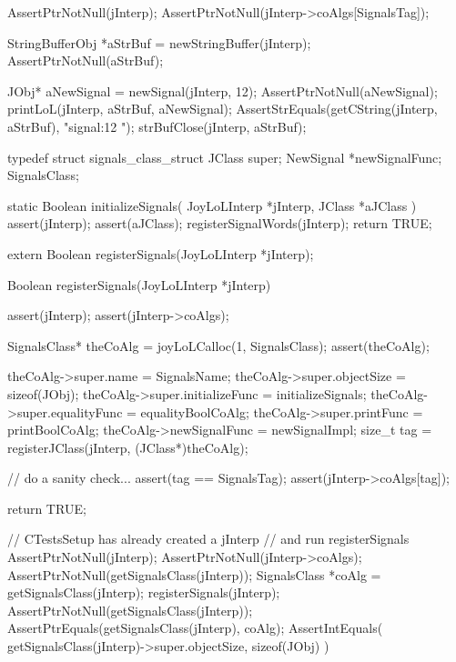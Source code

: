 \startCTest
  AssertPtrNotNull(jInterp);
  AssertPtrNotNull(jInterp->coAlgs[SignalsTag]);

  StringBufferObj *aStrBuf = newStringBuffer(jInterp);
  AssertPtrNotNull(aStrBuf);
  
  JObj* aNewSignal = newSignal(jInterp, 12);
  AssertPtrNotNull(aNewSignal);
  printLoL(jInterp, aStrBuf, aNewSignal);
  AssertStrEquals(getCString(jInterp, aStrBuf), "signal:12 ");
  strBufClose(jInterp, aStrBuf);
\stopCTest
\stopTestCase
\stopTestSuite

\startTestSuite[registerSignals]

\startCHeader
typedef struct signals_class_struct {
  JClass     super;
  NewSignal *newSignalFunc;
} SignalsClass;

\stopCHeader

\startCCode
static Boolean initializeSignals(
  JoyLoLInterp *jInterp,
  JClass       *aJClass
) {
  assert(jInterp);
  assert(aJClass);
  registerSignalWords(jInterp);
  return TRUE;
}
\stopCCode

\startCHeader
extern Boolean registerSignals(JoyLoLInterp *jInterp);
\stopCHeader
{}

\startCCode
Boolean registerSignals(JoyLoLInterp *jInterp) {
  assert(jInterp);
  assert(jInterp->coAlgs);
  
  SignalsClass* theCoAlg
    = joyLoLCalloc(1, SignalsClass);
  assert(theCoAlg);
  
  theCoAlg->super.name           = SignalsName;
  theCoAlg->super.objectSize     = sizeof(JObj);
  theCoAlg->super.initializeFunc = initializeSignals;
  theCoAlg->super.equalityFunc   = equalityBoolCoAlg;
  theCoAlg->super.printFunc      = printBoolCoAlg;
  theCoAlg->newSignalFunc        = newSignalImpl;
  size_t tag =
    registerJClass(jInterp, (JClass*)theCoAlg);
  
  // do a sanity check...
  assert(tag == SignalsTag);
  assert(jInterp->coAlgs[tag]);
   
  return TRUE;
}
\stopCCode


\startCTest
  // CTestsSetup has already created a jInterp
  // and run registerSignals
  AssertPtrNotNull(jInterp);
  AssertPtrNotNull(jInterp->coAlgs);
  AssertPtrNotNull(getSignalsClass(jInterp));
  SignalsClass *coAlg = getSignalsClass(jInterp);
  registerSignals(jInterp);
  AssertPtrNotNull(getSignalsClass(jInterp));
  AssertPtrEquals(getSignalsClass(jInterp), coAlg);
  AssertIntEquals(
    getSignalsClass(jInterp)->super.objectSize,
    sizeof(JObj)
  )
\stopCTest
\stopTestCase
\stopTestSuite
